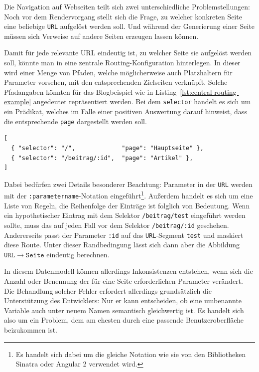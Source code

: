 Die Navigation auf Webseiten teilt sich zwei unterschiedliche Problemstellungen: Noch vor dem Rendervorgang stellt sich die Frage, zu welcher konkreten Seite eine beliebige \texttt{URL} aufgelöst werden soll. Und während der Generierung einer Seite müssen sich Verweise auf andere Seiten erzeugen lassen können.

Damit für jede relevante URL eindeutig ist, zu welcher Seite sie aufgelöst werden soll, könnte man in \idename{} eine zentrale Routing-Konfiguration hinterlegen. In dieser wird einer Menge von Pfaden, welche möglicherweise auch Platzhaltern für Parameter vorsehen, mit den entsprechenden Zielseiten verknüpft. Solche Pfadangaben könnten für das Blogbeispiel wie in Listing~\ref{lst:central-routing-example} angedeutet repräsentiert werden. Bei dem \texttt{selector} handelt es sich um ein Prädikat, welches im Falle einer positiven Auswertung darauf hinweist, dass die entsprechende \texttt{page} dargestellt werden soll.

\begin{lstlisting}[float=h!,caption={Zentrales Routing für das Blog-Beispiel}, label={lst:central-routing-example}]
[
  { "selector": "/",             "page": "Hauptseite" },
  { "selector": "/beitrag/:id",  "page": "Artikel" },
]
\end{lstlisting}

Dabei bedürfen zwei Details besonderer Beachtung: Parameter in der \texttt{URL} werden mit der  \texttt{:parametername}-Notation eingeführt\footnote{Es handelt sich dabei um die gleiche Notation wie sie von den Bibliotheken Sinatra oder Angular 2 verwendet wird.}. Außerdem handelt es sich um eine Liste von Regeln, die Reihenfolge der Einträge ist folglich von Bedeutung. Wenn ein hypothetischer Eintrag mit dem Selektor \texttt{/beitrag/test} eingeführt werden sollte, muss das auf jeden Fall vor dem Selektor \texttt{/beitrag/:id} geschehen. Andererseits passt der Parameter \texttt{:id} auf das \texttt{URL}-Segment \texttt{test} und maskiert diese Route. Unter dieser Randbedingung lässt sich dann aber die Abbildung $\mathtt{URL} \rightarrow \mathtt{Seite}$ eindeutig berechnen.

In diesem Datenmodell können allerdings Inkonsistenzen entstehen, wenn sich die Anzahl oder Benennung der für eine Seite erforderlichen Parameter verändert. Die Behandlung solcher Fehler erfordert allerdings grundsätzlich die Unterstützung des Entwicklers: Nur er kann entscheiden, ob eine umbenannte Variable auch unter neuem Namen semantisch gleichwertig ist. Es handelt sich also um ein Problem, dem am ehesten durch eine passende Benutzeroberfläche beizukommen ist.


